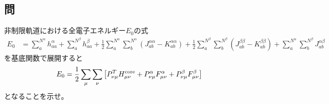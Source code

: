 \subsection{問}
非制限軌道における全電子エネルギー$E_0$の式
\begin{align}
	E_0
&=
	\sum_a^{N^\alpha}
		h^\alpha_{aa}
	+
	\sum_a^{N^\beta}
		h^\beta_{aa}
	+
	\frac{1}{2}
	\sum_a^{N^\alpha}
	\sum_b^{N^\alpha}\left(
		J^{\alpha\alpha}_{ab}
		-
		K^{\alpha\alpha}_{ab}
	\right)
	+
	\frac{1}{2}
	\sum_a^{N^\beta}
	\sum_b^{N^\beta}\left(
		J^{\beta\beta}_{ab}
		-
		K^{\beta\beta}_{ab}
	\right)
	+
	\sum_a^{N^\alpha}
	\sum_b^{N^\beta}
		J^{\alpha\beta}_{ab}
\end{align}
を基底関数で展開すると
\begin{align}
	E_0
&=
	\frac{1}{2}
	\sum_\mu
	\sum_\nu\left[
		P^T_{\nu\mu}
		H^{\rm core}_{\mu\nu}
		+
		P^\alpha_{\nu\mu}
		F^\alpha_{\mu\nu}
		+
		P^\beta_{\nu\mu}
		F^\beta_{\mu\nu}
	\right]
\end{align}
となることを示せ。

